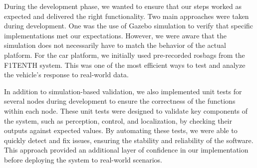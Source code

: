 During the development phase, we wanted to ensure that our steps worked as expected and delivered the right functionality. Two main approaches were taken during development. One was the use of Gazebo simulation to verify that specific implementations met our expectations. However, we were aware that the simulation does not necessarily have to match the behavior of the actual platform. For the car platform, we initially used pre-recorded rosbags from the F1TENTH system. This was one of the most efficient ways to test and analyze the vehicle’s response to real-world data.

In addition to simulation-based validation, we also implemented unit tests for several nodes during development to ensure the correctness of the functions within each node. These unit tests were designed to validate key components of the system, such as perception, control, and localization, by checking their outputs against expected values. By automating these tests, we were able to quickly detect and fix issues, ensuring the stability and reliability of the software. This approach provided an additional layer of confidence in our implementation before deploying the system to real-world scenarios.